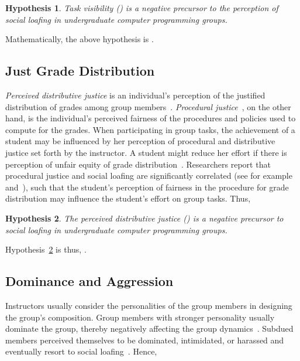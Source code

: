 \documentclass[a4paper,a4paper,BCOR12mm,12pt,abstracton,pointednumbers,tablecaptionabove,footinclude,halfparskip,normalheadings,]{scrartcl}
\newtheorem{hypothesis}{Hypothesis}
\begin{document}
\begin{hypothesis}
Task visibility () is a negative precursor to the perception of social loafing in undergraduate computer programming groups.\label{hyp:taskvis}
\end{hypothesis}

Mathematically, the above hypothesis is .

\subsection{Just Grade Distribution}

{\em Perceived distributive justice} is an individual's perception of the justified distribution of grades among group members~\citep{Liden04}. {\em Procedural justice}~\citep{Greenberg90}, on the other hand, is the individual's perceived fairness of the procedures and policies used to compute for the grades. When participating in group tasks, the achievement of a student may be influenced by her perception of procedural and distributive justice set forth by the instructor. A student might reduce her effort if there is perception of unfair equity of grade distribution~\citep{Kidwell93}. Researchers report that procedural justice and social loafing are significantly correlated (see for example~\citet{Liden04} and~\citet{Karau93}), such that the student's perception of fairness in the procedure for grade distribution may influence the student's effort on group tasks. Thus, 

\begin{hypothesis}
The perceived distributive justice () is a negative precursor to social loafing in undergraduate computer programming groups.\label{hyp:justice}
\end{hypothesis}

Hypothesis~\ref{hyp:justice} is thus, .

\subsection{Dominance and Aggression}

Instructors usually consider the personalities of the group members in designing the group's composition. Group members with stronger personality usually dominate the group, thereby negatively affecting the group dynamics~\citep{Palloff03}. Subdued members perceived themselves to be dominated, intimidated, or harassed and eventually resort to social loafing~\citep{Michaelsen97}. Hence,
\end{document}
